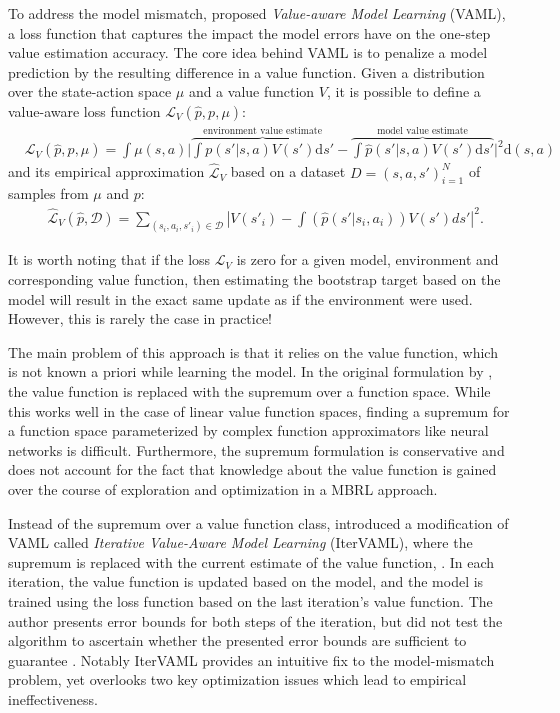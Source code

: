 To address the model mismatch, \cite{vaml} proposed \emph{Value-aware Model Learning} (VAML), a loss function that captures the impact the model errors have on the one-step value estimation accuracy.
The core idea behind VAML is to penalize a model prediction by the resulting difference in a value function. Given a distribution over the state-action space $\mu$  and a value function $V$, it is possible to define a value-aware loss function $\mathcal{L}_V(\hat{p}, p, \mu)$:
\begin{align}
    &\mathcal{L}_V(\hat{p}, p, \mu) = \int \mu(s,a) \bigg|\overbrace{\int p(s'|s,a)V(s')\mathrm{d}s'}^{\text{environment value estimate}}  - \overbrace{\int \hat{p}(s'|s,a) V(s') \mathrm{d}s'}^{\text{model value estimate}}\bigg|^2 \mathrm{d} (s,a)
    \end{align}
    and its empirical approximation $\hat{\mathcal{L}}_V$ based on a dataset $D = (s,a,s')_{i=1}^N$ of samples from $\mu$ and $p$:
    \begin{align}
    &\hat{\mathcal{L}}_V(\hat{p}, \mathcal{D}) = \sum_{(s_i,a_i,s'_i)\in\mathcal{D}} \left|V(s'_i) - \int \left(\hat{p}(s'|s_i,a_i)\right) V(s') ds'\right|^2\label{IterVAMLloss}.
\end{align}

It is worth noting that if the loss $\mathcal{L}_V$ is zero for a given model, environment and corresponding value function, then estimating the bootstrap target based on the model will result in the exact same update as if the environment were used. However, this is rarely the case in practice!

The main problem of this approach is that it relies on the value function, which is not known a priori while learning the model. In the original formulation by \textcite{vaml}, the value function is replaced with the supremum over a function space.
While this works well in the case of linear value function spaces, finding a supremum for a function space parameterized by complex function approximators like neural networks is difficult.
Furthermore, the supremum formulation is conservative and does not account for the fact that knowledge about the value function is gained over the course of exploration and optimization in a MBRL approach.

Instead of the supremum over a value function class, \textcite{itervaml} introduced a modification of VAML called \emph{Iterative Value-Aware Model Learning} (IterVAML), where the supremum is replaced with the current estimate of the value function, .
In each iteration, the value function is updated based on the model, and the model is trained using the loss function based on the last iteration's value function.
The author presents error bounds for both steps of the iteration, but did not test the algorithm to ascertain whether the presented error bounds are sufficient to guarantee . 
Notably IterVAML provides an intuitive fix to the model-mismatch problem, yet overlooks two key optimization issues which lead to empirical ineffectiveness.  

